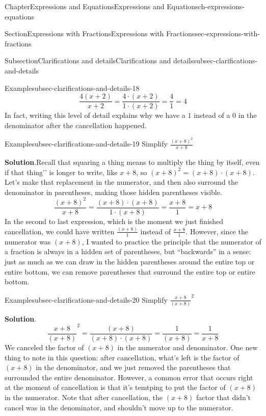 \documentclass[twoside,11pt,]{book}
\newcommand{\blocktitlefont}{\relax}
\numberwithin{equation}{chapter}
\begin{document}
\begin{chapterptx}{Chapter}{Expressions and Equations}{}{Expressions and Equations}{}{}{ch-expressions-equations}
\begin{sectionptx}{Section}{Expressions with Fractions}{}{Expressions with Fractions}{}{}{sec-expressions-with-fractions}
\begin{subsectionptx}{Subsection}{Clarifications and details}{}{Clarifications and details}{}{}{subsec-clarifications-and-details}
\begin{example}{Example}{}{subsec-clarifications-and-details-18}
\begin{equation*}
\frac{4(x+2)}{x+2} = \frac{4 \cdot (x+2)}{1 \cdot (x+2)} = \frac41 = 4
\end{equation*}
In fact, writing this level of detail explains why we have a \(1\) instead of a \(0\) in the denominator after the cancellation happened.%
\end{example}
\begin{example}{Example}{}{subsec-clarifications-and-details-19}%
Simplify \(\frac{(x+8)^2}{x+8}\)%
\par\smallskip%
\noindent\textbf{\blocktitlefont Solution}.\hypertarget{subsec-clarifications-and-details-19-2}{}\quad{}Recall that squaring a thing means to multiply the thing by itself, even if that \textasciigrave{}\textasciigrave{}thing'{}'{} is longer to write, like \(x+8\), so \((x+8)^2=(x+8) \cdot (x+8)\). Let's make that replacement in the numerator, and then also surround the denominator in parentheses, making those hidden parentheses visible.%
\begin{equation*}
\frac{(x+8)^2}{x+8} = \frac{(x+8) \cdot (x+8)}{1 \cdot (x+8)} = \frac{x+8}{1} = x+8
\end{equation*}
In the second to last expression, which is the moment we just finished cancellation, we could have written \(\frac{(x+8)}{1}\) instead of \(\frac{x+8}{1}\). However, since the numerator was \((x+8)\), I wanted to practice the principle that the numerator of a fraction is always in a hidden set of parentheses, but ``backwards'' in a sense: just as much as we can draw in the hidden parentheses around the entire top or entire bottom, we can remove parentheses that surround the entire top or entire bottom.%
\end{example}
\begin{example}{Example}{}{subsec-clarifications-and-details-20}%
Simplify \(\frac{x+8}{(x+8)}^2\)%
\par\smallskip%
\noindent\textbf{\blocktitlefont Solution}.\hypertarget{subsec-clarifications-and-details-20-2}{}\quad{}%
\begin{equation*}
\frac{x+8}{(x+8)}^2 = \frac{(x+8)}{(x+8) \cdot (x+8)} = \frac1{(x+8)} = \frac{1}{x+8}
\end{equation*}
We canceled the factor of \((x+8)\) in the numerator and denominator. One new thing to note in this question: after cancellation, what's left is the factor of \((x+8)\) in the denominator, and we just removed the parentheses that surrounded the entire denominator. However, a common error that occurs right at the moment of cancellation is that it's temtping to put the factor of \((x+8)\) in the numerator. Note that after cancellation, the \((x+8)\) factor that didn't cancel was in the denominator, and shouldn't move up to the numerator.%

\end{example}
\end{subsectionptx}
\end{sectionptx}
\end{chapterptx}
\end{document}
